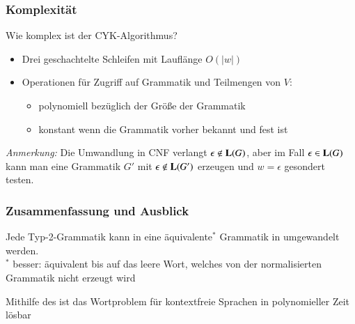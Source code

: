 \documentclass[aspectratio=1610,onlymath]{beamer}
\begin{document}
\begin{frame}\frametitle{Komplexität}

\alert{Wie komplex ist der CYK-Algorithmus?}
\begin{itemize}
\item Drei geschachtelte Schleifen mit Lauflänge $O(|w|)$
\item Operationen für Zugriff auf Grammatik und Teilmengen von $V$:%
\begin{itemize}
\item polynomiell bezüglich der Größe der Grammatik
\item konstant wenn die Grammatik vorher bekannt und fest ist
\end{itemize}
\end{itemize}\bigskip

\bigskip

\emph{Anmerkung:} Die Umwandlung in CNF verlangt $\epsilon\notin\textbf{\textcolor{black}{L}}(G)$, aber 
im Fall $\epsilon\in\textbf{\textcolor{black}{L}}(G)$ kann man eine Grammatik $G'$ mit $\epsilon\notin\textbf{\textcolor{black}{L}}(G')$ erzeugen und
$w=\epsilon$ gesondert testen.

\end{frame}


\begin{frame}\frametitle{Zusammenfassung und Ausblick}

Jede Typ-2-Grammatik kann in eine äquivalente$^*$ Grammatik in  umgewandelt werden.\\
{\tiny $^*$ besser: äquivalent bis auf das leere Wort, welches von der normalisierten Grammatik nicht erzeugt wird}
\bigskip

Mithilfe des  ist das Wortproblem für kontextfreie Sprachen in polynomieller Zeit lösbar
\bigskip


\end{frame}
\end{document}

